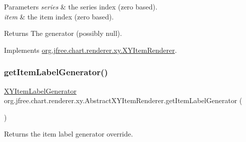 \begin{DoxyParams}{Parameters}
{\em series} & the series index (zero based). \\
\hline
{\em item} & the item index (zero based).\\
\hline
\end{DoxyParams}
\begin{DoxyReturn}{Returns}
The generator (possibly {\ttfamily null}). 
\end{DoxyReturn}


Implements \mbox{\hyperlink{interfaceorg_1_1jfree_1_1chart_1_1renderer_1_1xy_1_1_x_y_item_renderer_a3d045954d83096495f635a1681567f8f}{org.\+jfree.\+chart.\+renderer.\+xy.\+X\+Y\+Item\+Renderer}}.

\mbox{\label{classorg_1_1jfree_1_1chart_1_1renderer_1_1xy_1_1_abstract_x_y_item_renderer_a729add44689090d1e7df1ce62bffca43}} 
\subsubsection{\texorpdfstring{get\+Item\+Label\+Generator()}{getItemLabelGenerator()}\hspace{0.1cm}{\footnotesize\ttfamily [2/2]}}
{\footnotesize\ttfamily \mbox{\hyperlink{interfaceorg_1_1jfree_1_1chart_1_1labels_1_1_x_y_item_label_generator}{X\+Y\+Item\+Label\+Generator}} org.\+jfree.\+chart.\+renderer.\+xy.\+Abstract\+X\+Y\+Item\+Renderer.\+get\+Item\+Label\+Generator (\begin{DoxyParamCaption}{ }\end{DoxyParamCaption})}

Returns the item label generator override.

